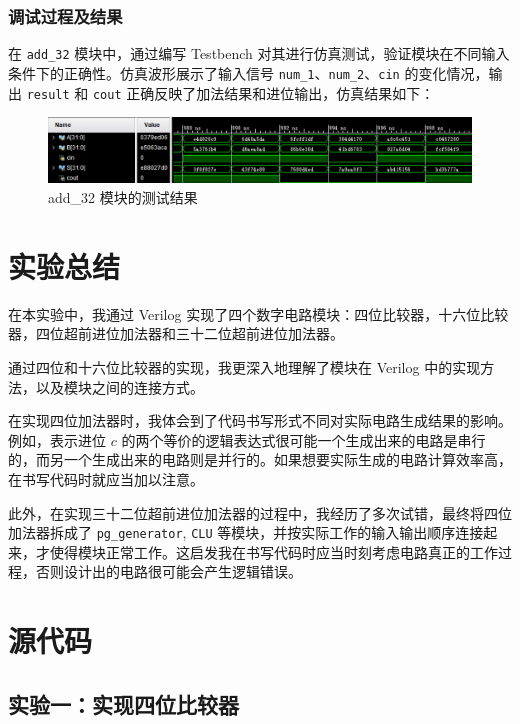 \documentclass[zihao=5, UTF8]{article}
\theoremstyle{MyLineTheoremStyle} %
\theoremstyle{MyBlockTheoremStyle} %
\theoremstyle{MySubsubsectionStyle} %
\begin{document}
\subsubsection{调试过程及结果}
在 \texttt{add\_32} 模块中，通过编写 Testbench 对其进行仿真测试，验证模块在不同输入条件下的正确性。仿真波形展示了输入信号 \texttt{num\_1}、\texttt{num\_2}、\texttt{cin} 的变化情况，输出 \texttt{result} 和 \texttt{cout} 正确反映了加法结果和进位输出，仿真结果如下：
\begin{figure}[htbp]
    \centering
    \includegraphics[width=\textwidth]{add_32.png} %
    \caption{add\_32 模块的测试结果}
    \label{fig:add_32模块的测试结果}
\end{figure}




\section{实验总结}

在本实验中，我通过 Verilog 实现了四个数字电路模块：四位比较器，十六位比较器，四位超前进位加法器和三十二位超前进位加法器。

通过四位和十六位比较器的实现，我更深入地理解了模块在 Verilog 中的实现方法，以及模块之间的连接方式。

在实现四位加法器时，我体会到了代码书写形式不同对实际电路生成结果的影响。例如，表示进位 \(c\) 的两个等价的逻辑表达式很可能一个生成出来的电路是串行的，而另一个生成出来的电路则是并行的。如果想要实际生成的电路计算效率高，在书写代码时就应当加以注意。

此外，在实现三十二位超前进位加法器的过程中，我经历了多次试错，最终将四位加法器拆成了 \texttt{pg\_generator}, \texttt{CLU} 等模块，并按实际工作的输入输出顺序连接起来，才使得模块正常工作。这启发我在书写代码时应当时刻考虑电路真正的工作过程，否则设计出的电路很可能会产生逻辑错误。

\section{源代码}

\subsection{实验一：实现四位比较器}
\end{document}
